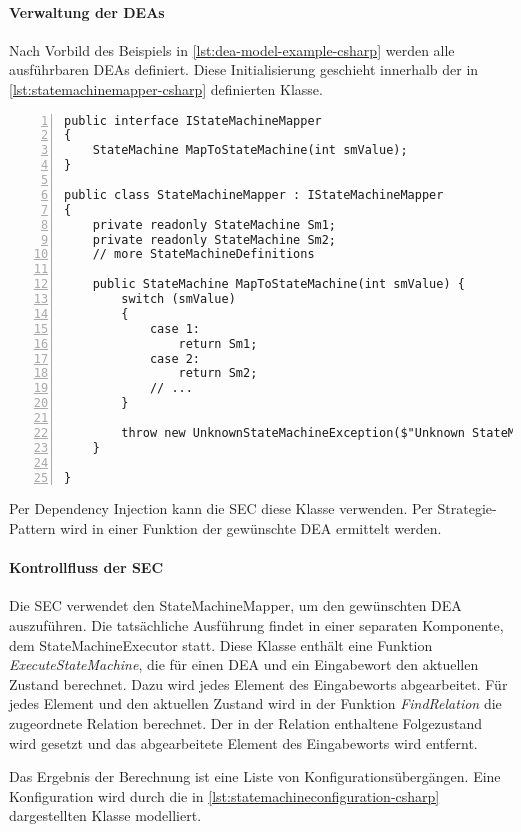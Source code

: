 \paragraph*{Verwaltung der DEAs}
Nach Vorbild des Beispiels in \cref{lst:dea-model-example-csharp} werden alle ausführbaren DEAs definiert. Diese Initialisierung geschieht innerhalb der in \cref{lst:statemachinemapper-csharp} definierten Klasse. 

\begin{lstlisting}[language={[Sharp]C}, breaklines=true, tabsize=2, showstringspaces=false, frame=single, numbers=left, basicstyle=\small,label = {lst:statemachinemapper-csharp}, caption={Modellierung eines StateMachineMappers in C\#}, captionpos=b] 
public interface IStateMachineMapper 
{
	StateMachine MapToStateMachine(int smValue);
}

public class StateMachineMapper : IStateMachineMapper
{
	private readonly StateMachine Sm1;
	private readonly StateMachine Sm2;
	// more StateMachineDefinitions
	
	public StateMachine MapToStateMachine(int smValue) {
		switch (smValue) 
		{
			case 1:
				return Sm1;
			case 2: 
				return Sm2;
			// ...
		}
		
        throw new UnknownStateMachineException($"Unknown StateMachine for value [{smValue}].");
	}
	
}
\end{lstlisting}

Per Dependency Injection kann die SEC diese Klasse verwenden. Per Strategie-Pattern wird in einer Funktion der gewünschte DEA ermittelt werden.

\paragraph*{Kontrollfluss der SEC}
Die SEC verwendet den StateMachineMapper, um den gewünschten DEA auszuführen. Die tatsächliche Ausführung findet in einer separaten Komponente, dem StateMachineExecutor statt. Diese Klasse enthält eine Funktion \textit{ExecuteStateMachine}, die für einen DEA und ein Eingabewort den aktuellen Zustand berechnet. Dazu wird jedes Element des Eingabeworts abgearbeitet. Für jedes Element und den aktuellen Zustand wird in der Funktion \textit{FindRelation} die zugeordnete Relation berechnet. Der in der Relation enthaltene Folgezustand wird gesetzt und das abgearbeitete Element des Eingabeworts wird entfernt. 

Das Ergebnis der Berechnung ist eine Liste von Konfigurationsübergängen. Eine Konfiguration wird durch die in \cref{lst:statemachineconfiguration-csharp} dargestellten Klasse modelliert.

